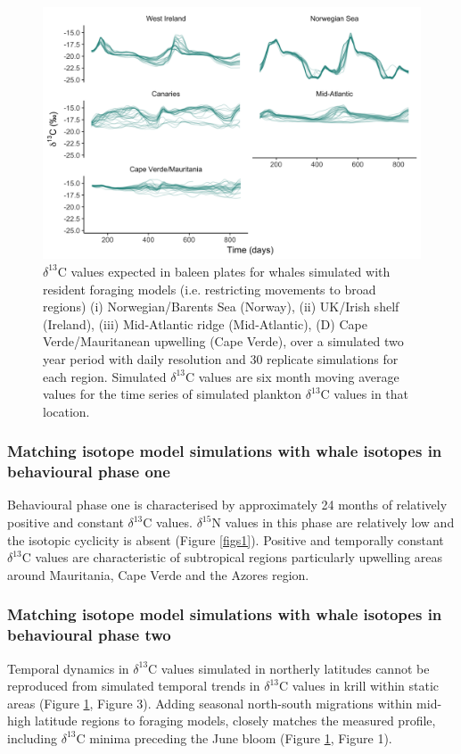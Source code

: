 \documentclass[a4paper,12pt]{article}
\begin{document}
  \begin{figure}[!htbp]
    \centering
      \includegraphics[width=\linewidth]{figures/Figure-S4-regions-d13C.png}
      \caption{$\delta^{13}$C values expected in baleen plates for whales simulated with resident foraging models (i.e. restricting movements to broad regions) (i)  Norwegian/Barents Sea (Norway), (ii) UK/Irish shelf (Ireland), (iii) Mid-Atlantic ridge (Mid-Atlantic), (D) Cape Verde/Mauritanean upwelling (Cape Verde), over a simulated two year period with daily resolution and 30 replicate simulations for each region. 
      Simulated $\delta^{13}$C values are six month moving average values for the time series of simulated plankton $\delta^{13}$C values in that location.}
      \label{figs4}
  \end{figure}
 
\subsubsection*{Matching isotope model simulations with whale isotopes in behavioural phase one}
Behavioural phase one is characterised by approximately 24 months of relatively positive and constant $\delta^{13}$C values. 
$\delta^{15}$N values in this phase are relatively low and the isotopic cyclicity is absent (Figure \ref{figs1}). 
Positive and temporally constant $\delta^{13}$C values are characteristic of subtropical regions particularly upwelling areas around Mauritania, Cape Verde and the Azores region.
 
\subsubsection*{Matching isotope model simulations with whale isotopes in behavioural phase two}
Temporal dynamics in $\delta^{13}$C values simulated in northerly latitudes cannot be reproduced from simulated temporal trends in $\delta^{13}$C values in krill within static areas (Figure \ref{figs4}, Figure 3). 
Adding seasonal north-south migrations within mid-high latitude regions to foraging models, closely matches the measured profile, including $\delta^{13}$C minima preceding the June bloom (Figure \ref{figs4}, Figure 1).
\end{document}
